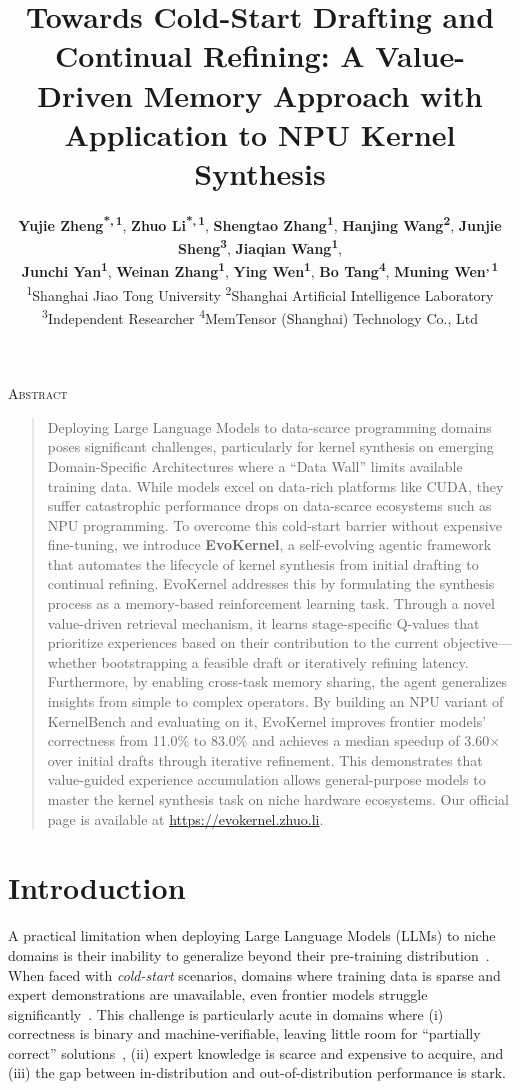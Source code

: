 \documentclass{article} %
\title{Towards Cold-Start Drafting and Continual Refining: A Value-Driven Memory Approach with Application to NPU Kernel Synthesis}
\author{%
  \textbf{Yujie Zheng\textsuperscript{*,\,1}},\hspace{0.6em} \textbf{Zhuo Li\textsuperscript{*,\,1}},\hspace{0.6em} \textbf{Shengtao Zhang\textsuperscript{1}},\hspace{0.6em}
  \textbf{Hanjing Wang\textsuperscript{2}},\hspace{0.6em}
  \textbf{Junjie Sheng\textsuperscript{3}},\hspace{0.6em}
  \textbf{Jiaqian Wang\textsuperscript{1}}, \\
  \textbf{Junchi Yan\textsuperscript{1}},\hspace{0.6em}
  \textbf{Weinan Zhang\textsuperscript{1}},\hspace{0.6em} \textbf{Ying Wen\textsuperscript{1}},\hspace{0.6em} \textbf{Bo Tang\textsuperscript{4}},\hspace{0.6em} \textbf{Muning Wen\textsuperscript{\textdagger,\,1}}\\[1em]
  \normalfont
  \textsuperscript{1}Shanghai Jiao Tong University \quad \textsuperscript{2}Shanghai Artificial Intelligence Laboratory \\
  \textsuperscript{3}Independent Researcher \quad \textsuperscript{4}MemTensor (Shanghai) Technology Co., Ltd
}
\newcommand{\ourmethod}{EvoKernel\xspace}
\theoremstyle{definition}
\theoremstyle{remark}
\renewenvironment{abstract}{%
  \centerline{\large\textsc{Abstract}}
  \vspace{1ex}%
  \begin{quote}%
}{%
  \end{quote}%
  \par\bigskip %
}
\begin{document}
\maketitle
\renewcommand{\thefootnote}{\fnsymbol{footnote}}
\thispagestyle{plain}
\pagestyle{plain}

\vskip 0.1in

\begin{abstract}
Deploying Large Language Models to data-scarce programming domains poses significant challenges, particularly for kernel synthesis on emerging Domain-Specific Architectures where a ``Data Wall'' limits available training data.
While models excel on data-rich platforms like CUDA, they suffer catastrophic performance drops on data-scarce ecosystems such as NPU programming.
To overcome this cold-start barrier without expensive fine-tuning, we introduce \textbf{\ourmethod}, a self-evolving agentic framework that automates the lifecycle of kernel synthesis from initial drafting to continual refining.
\ourmethod addresses this by formulating the synthesis process as a memory-based reinforcement learning task. Through a novel value-driven retrieval mechanism, it learns stage-specific Q-values that prioritize experiences based on their contribution to the current objective—whether bootstrapping a feasible draft or iteratively refining latency.
Furthermore, by enabling cross-task memory sharing, the agent generalizes insights from simple to complex operators.
By building an NPU variant of KernelBench and evaluating on it, \ourmethod improves frontier models' correctness from 11.0\% to 83.0\% and achieves a median speedup of 3.60$\times$ over initial drafts through iterative refinement. This demonstrates that value-guided experience accumulation allows general-purpose models to master the kernel synthesis task on niche hardware ecosystems. Our official page is available at \url{https://evokernel.zhuo.li}.
\end{abstract}

\section{Introduction}
A practical limitation when deploying Large Language Models (LLMs) to niche domains is their inability to generalize beyond their pre-training distribution~\citep{minaee2024large, wang2024generalization}. When faced with \emph{cold-start} scenarios, domains where training data is sparse and expert demonstrations are unavailable, even frontier models struggle significantly~\citep{kostikova2025lllms, joel2410survey}. 
This challenge is particularly acute in domains where (i) correctness is binary and machine-verifiable, leaving little room for ``partially correct'' solutions~\citep{jain2024livecodebench, yan2024codescope}, (ii) expert knowledge is scarce and expensive to acquire, and (iii) the gap between in-distribution and out-of-distribution performance is stark.
\end{document}
